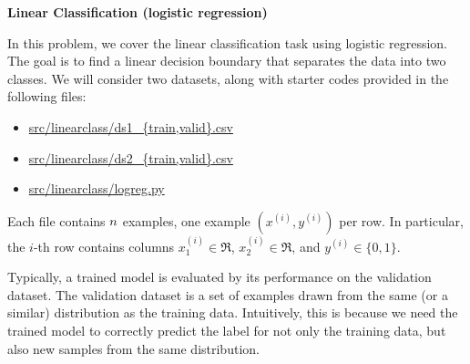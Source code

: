 \item {} {\bf Linear Classification (logistic regression)}

In this problem, we cover the linear classification task using logistic regression. The goal is to find a linear decision boundary that
separates the data into two classes. We will consider two datasets, along with starter codes provided in the following
files:
\begin{center}
\begin{itemize} %
	\item \url{src/linearclass/ds1_{train,valid}.csv}
	\item \url{src/linearclass/ds2_{train,valid}.csv}
        \item \url{src/linearclass/logreg.py}
\end{itemize}
\end{center}
Each file contains ${n}$ examples, one example $(x^{(i)}, y^{(i)})$ per row.
In particular, the $i$-th row contains columns $x^{(i)}_1\in\Re$,
$x^{(i)}_2\in\Re$, and $y^{(i)}\in\{0, 1\}$.

Typically, a trained model is evaluated by its performance on the validation dataset. The validation dataset is a set of examples drawn from the same (or a similar) distribution as the training data. Intuitively, this is because we need the trained model to correctly predict the label for not only the training data, but also new samples from the same distribution.

\begin{enumerate}
	
        \ifnum{} {
            
        } \fi

	
        \ifnum{} {
            
        } \fi

\end{enumerate}
